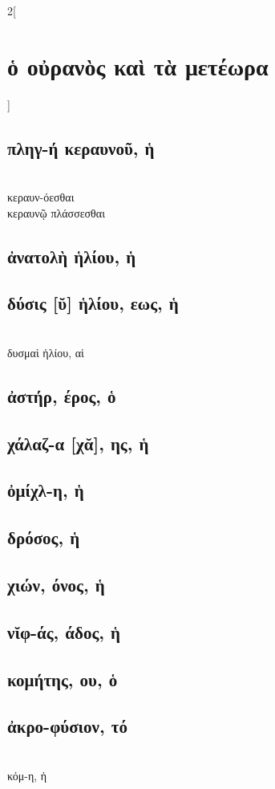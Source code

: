\documentclass{book}
\begin{document}
\begin{multicols}{2}[\section{ὁ οὐρανὸς καὶ τὰ μετέωρα}]
\subsection{πληγ-ή κεραυνοῦ, ἡ}
 ~\\
{κεραυν-όεσθαι}
 ~\\
κεραυνῷ πλάσσεσθαι 
\subsection{ἀνατολὴ ἡλίου, ἡ}
\subsection{δύσις [ῠ] ἡλίου, εως, ἡ}
 ~\\
δυσμαὶ ἡλίου, αἱ
\subsection{ἀστήρ, έρος, ὁ}
\subsection{χάλαζ-α [χᾰ], ης, ἡ}
\subsection{ὀμίχλ-η, ἡ}
\subsection{δρόσος, ἡ}
\subsection{χιών, όνος, ἡ}
\subsection{νῐφ-άς, άδος, ἡ}
\subsection{κομήτης, ου, ὁ}
\subsection{ἀκρο-φύσιον, τό}
 ~\\
κόμ-η, ἡ 

\end{multicols}
\end{document}
